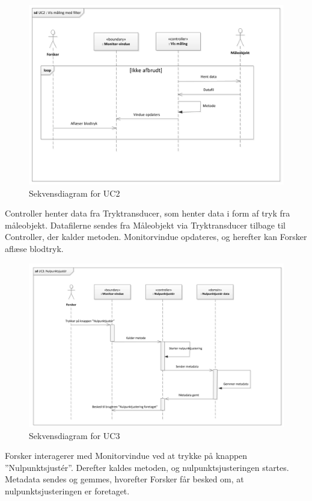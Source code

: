 \begin{figure}[H]
	\centering
	\includegraphics[width=1\textwidth]{Figurer/Snip20151104_32}
	\caption{Sekvensdiagram for UC2}
\end{figure}

Controller henter data fra Tryktransducer, som henter data i form af tryk fra måleobjekt. Datafilerne sendes fra Måleobjekt via Tryktransducer tilbage til Controller, der kalder metoden. Monitorvindue opdateres, og herefter kan Forsker aflæse blodtryk. 

\begin{figure}[H]
	\centering
	\includegraphics[width=1\textwidth]{Figurer/Snip20151104_33}
	\caption{Sekvensdiagram for UC3}
\end{figure}

Forsker interagerer med Monitorvindue ved at trykke på knappen ”Nulpunktsjustér”. Derefter kaldes metoden, og nulpunktsjusteringen startes. Metadata sendes og gemmes, hvorefter Forsker får besked om, at nulpunktsjusteringen er foretaget. 

